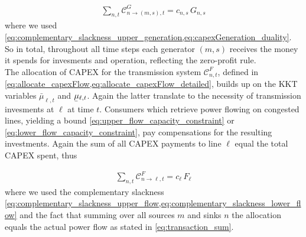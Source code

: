 \documentclass[11pt,twocolumn]{article}
\newcommand{\ubar}[1]{\underaccent{\bar}{#1}}
\newcommand{\note}[1]{\textcolor{Orange}{#1}}
\newcommand{\generation}[1][n]{g_{#1,s,t}}
\newcommand{\capacityGeneration}{G_{n,s}}
\newcommand{\capacityFlow}{F_{\ell}}
\newcommand{\capexGeneration}{c_{n,s}}
\newcommand{\capexFlow}{c_{\ell}}
\newcommand{\opexGeneration}[1][n]{o_{#1,s}}
\newcommand{\demand}[1][n]{d_{#1,a,t}}
\newcommand{\incidence}[1][n]{K_{#1,\ell}}
\newcommand{\mulowergeneration}[1][n]{\ubar{\mu}_{#1,s,t}}
\newcommand{\muuppergeneration}[1][n]{\bar{\mu}_{#1,s,t}}
\newcommand{\mulowerflow}{\ubar{\mu}_{\ell,t}}
\newcommand{\muupperflow}{\bar{\mu}_{\ell,t}}
\newcommand{\lmp}[1][n]{\lambda_{#1,t}}
\newcommand{\flow}{f_{\ell,t}}
\newcommand{\allocateCapexGeneration}[1][n]{\mathcal{C}^{G}_{#1,t}}
\newcommand{\allocateCapexFlow}[1][n]{\mathcal{C}^{F}_{#1,t}}
\newcommand{\Forall}[1]{\hspace{10pt} \forall \,\, #1 }
\begin{document}
\begin{align}
\sum_{n,t} \allocateCapexGeneration[n \rightarrow (m,s)] = \capexGeneration \, \capacityGeneration
\label{eq:no_profit_capex_generation}
\end{align}
where we used \cref{eq:complementary_slackness_upper_generation,eq:capexGeneration_duality}. So in total, throughout all time steps each generator $(m,s)$ receives the money it spends for invesments and operation, reflecting the zero-profit rule. 
\\ 

The allocation of CAPEX for the transmission system $\allocateCapexFlow$, defined in \cref{eq:allocate_capexFlow,eq:allocate_capexFlow_detailed}, builds up on the KKT variables $\muupperflow$ and $\mulowerflow$. Again the latter translate to the necessity of transmission invesments at $\ell$ at time $t$. Consumers which retrieve power flowing on congested lines, yielding a bound \cref{eq:upper_flow_capacity_constraint} or \eqref{eq:lower_flow_capacity_constraint}, pay compensations for the resulting investments. Again the sum of all CAPEX payments to line $\ell$ equal the total CAPEX spent, thus

\begin{align}
\sum_{n,t} \allocateCapexFlow[n \rightarrow \ell] = \capexFlow \, \capacityFlow  
\label{eq:no_profit_capex_flow}
\end{align}
where we used the complementary slackness \cref{eq:complementary_slackness_upper_flow,eq:complementary_slackness_lower_flow} and the fact that summing over all sources $m$ and sinks $n$ the allocation equals the actual power flow as stated in \cref{eq:transaction_sum}. 
\end{document}
